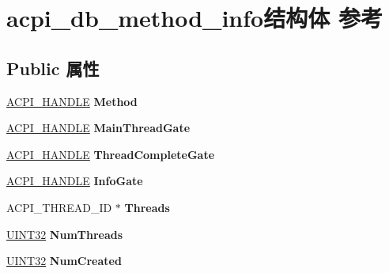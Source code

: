 \hypertarget{structacpi__db__method__info}{}\section{acpi\+\_\+db\+\_\+method\+\_\+info结构体 参考}
\label{structacpi__db__method__info}
\subsection*{Public 属性}
\begin{DoxyCompactItemize}
\item 
\mbox{\label{structacpi__db__method__info_af149576df6a3a09d7335520beb88b99c}} 
\hyperlink{interfacevoid}{A\+C\+P\+I\+\_\+\+H\+A\+N\+D\+LE} {\bfseries Method}
\item 
\mbox{\label{structacpi__db__method__info_ae601d005e6d965be2e0b1a5ed5012bcc}} 
\hyperlink{interfacevoid}{A\+C\+P\+I\+\_\+\+H\+A\+N\+D\+LE} {\bfseries Main\+Thread\+Gate}
\item 
\mbox{\label{structacpi__db__method__info_a607262401c57800b453244fa42b5386c}} 
\hyperlink{interfacevoid}{A\+C\+P\+I\+\_\+\+H\+A\+N\+D\+LE} {\bfseries Thread\+Complete\+Gate}
\item 
\mbox{\label{structacpi__db__method__info_a9b6be809e57512dd0545cecc81dafdfe}} 
\hyperlink{interfacevoid}{A\+C\+P\+I\+\_\+\+H\+A\+N\+D\+LE} {\bfseries Info\+Gate}
\item 
\mbox{\label{structacpi__db__method__info_a504a9ada11f16782e97fb9598b090812}} 
A\+C\+P\+I\+\_\+\+T\+H\+R\+E\+A\+D\+\_\+\+ID $\ast$ {\bfseries Threads}
\item 
\mbox{\label{structacpi__db__method__info_aff98bec8f9dbf12140c92fe0c33389e1}} 
\hyperlink{_processor_bind_8h_ae1e6edbbc26d6fbc71a90190d0266018}{U\+I\+N\+T32} {\bfseries Num\+Threads}
\item 
\mbox{\label{structacpi__db__method__info_a83c085fa259bbed8e4accfcc57b7a128}} 
\hyperlink{_processor_bind_8h_ae1e6edbbc26d6fbc71a90190d0266018}{U\+I\+N\+T32} {\bfseries Num\+Created}

\end{DoxyCompactItemize}
